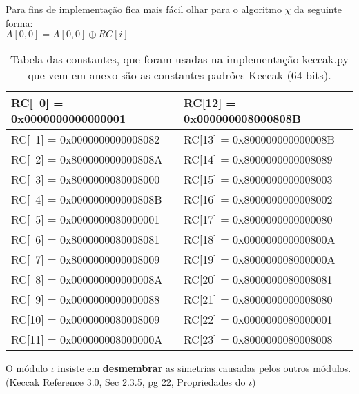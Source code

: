 \documentclass[12pt, a4paper]{article}
\begin{document}
\begin{enumerate}
\begin{enumerate}
Para fins de implementação fica mais fácil olhar para o algoritmo $\chi$ da
seguinte forma:\\
$A[0,0] = A[0,0] \oplus RC[i]$\\

\begin{table}
  \centering
  \begin{tabular}{|l|l|}
  \hline RC[~0] = 0x0000000000000001 & RC[12] = 0x000000008000808B \\
  \hline RC[~1] = 0x0000000000008082 & RC[13] = 0x800000000000008B \\
  \hline RC[~2] = 0x800000000000808A & RC[14] = 0x8000000000008089 \\
  \hline RC[~3] = 0x8000000080008000 & RC[15] = 0x8000000000008003 \\
  \hline RC[~4] = 0x000000000000808B & RC[16] = 0x8000000000008002 \\
  \hline RC[~5] = 0x0000000080000001 & RC[17] = 0x8000000000000080 \\
  \hline RC[~6] = 0x8000000080008081 & RC[18] = 0x000000000000800A \\
  \hline RC[~7] = 0x8000000000008009 & RC[19] = 0x800000008000000A \\
  \hline RC[~8] = 0x000000000000008A & RC[20] = 0x8000000080008081 \\
  \hline RC[~9] = 0x0000000000000088 & RC[21] = 0x8000000000008080 \\
  \hline RC[10] = 0x0000000080008009 & RC[22] = 0x0000000080000001 \\
  \hline RC[11] = 0x000000008000000A & RC[23] = 0x8000000080008008 \\
  \hline
  \end{tabular}
  \caption{Tabela das constantes, que foram usadas na implementação keccak.py
  que vem em anexo são as constantes padrões Keccak (64 bits).}
\end{table}

O módulo $\iota$ insiste em \textbf{\underline{desmembrar}} as simetrias
causadas pelos outros módulos. (Keccak Reference 3.0, Sec 2.3.5, pg 22,
Propriedades do $\iota$)\\


\end{enumerate}
\end{enumerate}
\end{document}
